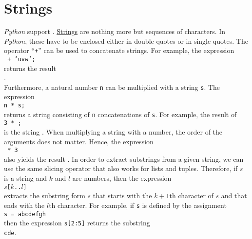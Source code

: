\section{Strings}
\textsl{Python} support .  \href{https://en.wikipedia.org/wiki/String_(computer_science)}{Strings} are
nothing more but sequences of characters.  In \textsl{Python}, these have to be 
enclosed either in double quotes or in single quotes.  The operator ``\texttt{+}'' can be used to concatenate
strings.  For example, the expression 
\\[0.2cm]
\hspace*{1.3cm}
\texttt{ + \texttt{'uvw'};}
\\[0.2cm]
returns the result
\\[0.2cm]
\hspace*{1.3cm}
.
\\[0.2cm]
Furthermore, a natural number \texttt{n} can be multiplied with a string \texttt{s}.  The expression
\\[0.2cm]
\hspace*{1.3cm}
\texttt{n * s;}
\\[0.2cm]
returns a string consisting of \texttt{n} concatenations of \texttt{s}.  For example,
the result of
\\[0.2cm]
\hspace*{1.3cm}
\texttt{3 * ;}
\\[0.2cm]
is the string .  When multiplying a string with a number, the order of the
arguments does not matter. Hence, the expression
\\[0.2cm]
\hspace*{1.3cm}
\texttt{ * 3}
\\[0.2cm]
also yields the result .  In order to extract substrings from a given string, we can use the same
slicing operator that also works for lists and tuples.  Therefore, if $s$ is a string and $k$ and $l$ are numbers, then
the expression 
\\[0.2cm]
\hspace*{1.3cm}
\texttt{$s$[$k$..$l$]}
\\[0.2cm]
extracts the substring form $s$ that starts with the $k+1$th character of $s$ and that ends with the $l$th character.
For example, if \texttt{s} is defined by the assignment
\\[0.2cm]
\hspace*{1.3cm}
\texttt{s = abcdefgh}
\\[0.2cm]
then the expression \texttt{s[2:5]} returns the substring
\\[0.2cm]
\hspace*{1.3cm}
\texttt{cde}.

